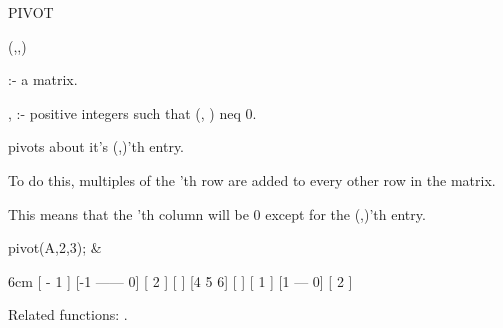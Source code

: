 \begin{Operator}[pivot]{PIVOT}

\begin{Syntax}
(,,)
\end{Syntax}
 
     :- a matrix. 

, :- positive integers such that (,
                     ) neq 0.

 pivots  about it's (,)'th 
entry. 
 
To do this, multiples of the 'th row are added to every other 
row in the matrix. 

This means that the 'th column will be 0 except for the 
(,)'th entry. 


\begin{Examples}

pivot(A,2,3); &
\begin{multilineoutput}{6cm}
[      - 1    ]
[-1  ------  0]
[      2      ]
[             ]
[4     5     6]
[             ]
[      1      ]
[1    ---    0]
[      2      ]
\end{multilineoutput}

\end{Examples}

Related functions:
.

\end{Operator}

